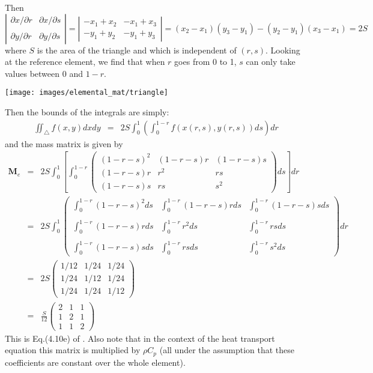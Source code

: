 Then 
\[
\left| 
\begin{array}{cc}
\partial x/\partial r & \partial x/\partial s \\ \\
\partial y/\partial r & \partial y/\partial s 
\end{array}
\right|  
=
\left| 
\begin{array}{cc}
- x_1+ x_2 & - x_1+ x_3 \\
- y_1+ y_2 & - y_1+ y_3 
\end{array}
\right|  
=
(x_2-x_1)(y_3-y_1)-(y_2-y_1)(x_3-x_1)
= 2S
\]
where $S$ is the area of the triangle and which is independent of $(r,s)$.
Looking at the reference element, we find that when $r$ goes from 0 to 1, 
$s$ can only take values between 0 and $1-r$.
\begin{center}
\texttt{[image: images/elemental\_mat/triangle]}
\end{center}
Then the bounds of the integrals are simply: 
\begin{eqnarray}
\iint_\triangle f(x,y) dx dy &=& 2S \int_0^{1} \left(\int_0^{1-r} f(x(r,s),y(r,s))  ds \right) dr 
\end{eqnarray}
and the mass matrix is given by
\begin{eqnarray}
{\bm M}_e 
&=& 2S \int_{0}^1 \left[ \int_{0}^{1-r}
\left(
\begin{array}{ccc}
(1-r-s)^2 & (1-r-s)r & (1-r-s)s \\
(1-r-s)r & r^2 & rs \\
(1-r-s)s & rs & s^2 
\end{array}
\right)
 ds \right] dr \\
&=& 
2S \int_{0}^1 
\left(
\begin{array}{ccc}
\int_0^{1-r} (1-r-s)^2 ds &\int_0^{1-r} (1-r-s)r ds& \int_0^{1-r} (1-r-s)s ds \\ \\
\int_0^{1-r} (1-r-s)r ds  &\int_0^{1-r} r^2 ds     & \int_0^{1-r} rs ds \\ \\
\int_0^{1-r} (1-r-s)s ds  &\int_0^{1-r} rs ds      & \int_0^{1-r} s^2 ds
\end{array}
\right)
 dr \\
&=& 
2S
\left(
\begin{array}{ccc}
1/12 & 1/24 & 1/24 \\
1/24 & 1/12 & 1/24 \\
1/24 & 1/24 & 1/12
\end{array}
\right)
\\
&=&
\frac{S}{12}
\left(
\begin{array}{ccc}
2 & 1 & 1 \\
1 & 2 & 1 \\
1 & 1 & 2
\end{array}
\right)
\end{eqnarray}
This is Eq.(4.10e) of \textcite{li06}. 
Also note that in the context of the heat transport equation this matrix is multiplied 
by $\rho C_p$ (all under the assumption that these coefficients are constant 
over the whole element).

